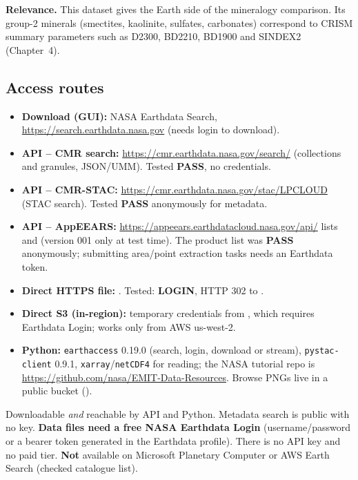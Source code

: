 \documentclass[10pt,a4paper]{article}
\newcommand{\OK}{\textcolor{ok}{\textbf{PASS}}}
\newcommand{\AUTH}{\textcolor{mid}{\textbf{LOGIN}}}
\begin{document}
\textbf{Relevance.} This dataset gives the Earth side of the mineralogy comparison. Its group-2 minerals (smectites, kaolinite, sulfates, carbonates) correspond to CRISM summary parameters such as D2300, BD2210, BD1900 and SINDEX2 (Chapter~4).

\subsection{Access routes}
\begin{itemize}
\item \textbf{Download (GUI):} NASA Earthdata Search, \url{https://search.earthdata.nasa.gov} (needs login to download).
\item \textbf{API -- CMR search:} \url{https://cmr.earthdata.nasa.gov/search/} (collections and granules, JSON/UMM). Tested \OK{}, no credentials.
\item \textbf{API -- CMR-STAC:} \url{https://cmr.earthdata.nasa.gov/stac/LPCLOUD} (STAC search). Tested \OK{} anonymously for metadata.
\item \textbf{API -- AppEEARS:} \url{https://appeears.earthdatacloud.nasa.gov/api/} lists  and  (version 001 only at test time). The product list was \OK{} anonymously; submitting area/point extraction tasks needs an Earthdata token.
\item \textbf{Direct HTTPS file:} . Tested: \AUTH{}, HTTP 302 to .
\item \textbf{Direct S3 (in-region):} temporary credentials from , which requires Earthdata Login; works only from AWS us-west-2.
\item \textbf{Python:} \texttt{earthaccess} 0.19.0 (search, login, download or stream), \texttt{pystac-client} 0.9.1, \texttt{xarray}/\texttt{netCDF4} for reading; the NASA tutorial repo is \url{https://github.com/nasa/EMIT-Data-Resources}. Browse PNGs live in a public bucket ().
\end{itemize}
\begin{verdict}
Downloadable \emph{and} reachable by API and Python. Metadata search is public with no key. \textbf{Data files need a free NASA Earthdata Login} (username/password or a bearer token generated in the Earthdata profile). There is no API key and no paid tier. \textbf{Not} available on Microsoft Planetary Computer or AWS Earth Search (checked catalogue list).
\end{verdict}
\end{document}
